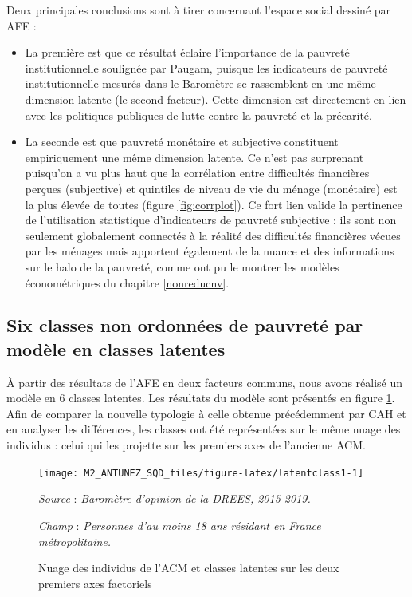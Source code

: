 \documentclass[12pt,a4paper]{reedthesis}
\begin{document}
Deux principales conclusions sont à tirer concernant l'espace social dessiné par AFE :
\begin{itemize}
\item
  La première est que ce résultat éclaire l'importance de la pauvreté institutionnelle soulignée par Paugam, puisque les indicateurs de pauvreté institutionnelle mesurés dans le Baromètre se rassemblent en une même dimension latente (le second facteur). Cette dimension est directement en lien avec les politiques publiques de lutte contre la pauvreté et la précarité.
\item
  La seconde est que pauvreté monétaire et subjective constituent empiriquement une même dimension latente. Ce n'est pas surprenant puisqu'on a vu plus haut que la corrélation entre difficultés financières perçues (subjective) et quintiles de niveau de vie du ménage (monétaire) est la plus élevée de toutes (figure \ref{fig:corrplot}). Ce fort lien valide la pertinence de l'utilisation statistique d'indicateurs de pauvreté subjective : ils sont non seulement globalement connectés à la réalité des difficultés financières vécues par les ménages mais apportent également de la nuance et des informations sur le halo de la pauvreté, comme ont pu le montrer les modèles économétriques du chapitre \ref{nonreducnv}.
\end{itemize}
\hypertarget{sec:esexplostructutypo}{%
\subsection{Six classes non ordonnées de pauvreté par modèle en classes latentes}\label{sec:esexplostructutypo}}

À partir des résultats de l'AFE en deux facteurs communs, nous avons réalisé un modèle en 6 classes latentes. Les résultats du modèle sont présentés en figure \ref{fig:latentclass1}. Afin de comparer la nouvelle typologie à celle obtenue précédemment par CAH et en analyser les différences, les classes ont été représentées sur le même nuage des individus : celui qui les projette sur les premiers axes de l'ancienne ACM.
\begin{figure}[!ht]

{\centering \texttt{[image: M2\_ANTUNEZ\_SQD\_files/figure-latex/latentclass1-1]} 

}

\caption[Nuage des individus de l'ACM et classes latentes sur les deux premiers axes factoriels]{Nuage des individus de l'ACM et classes latentes sur les deux premiers axes factoriels}\label{fig:latentclass1}

\footnotesize


\emph{Source} : \emph{Baromètre d’opinion de la DREES, 2015-2019.}


\emph{Champ} : \emph{Personnes d’au moins 18 ans résidant en France métropolitaine.}
\normalsize\end{figure}
\end{document}
